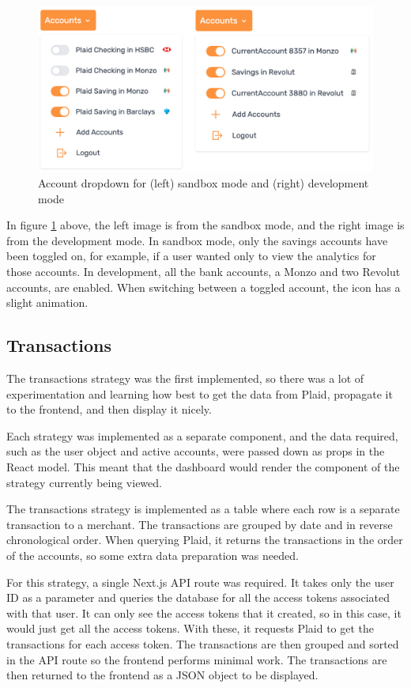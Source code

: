 \begin{figure}[H]
	\centering
	\includegraphics[width=\textwidth]{images/Accounts_dropdown.png}
	\caption{Account dropdown for (left) sandbox mode and (right) development mode}
	\label{fig:AccountsDropdown}
\end{figure}

In figure \ref{fig:AccountsDropdown} above, the left image is from the sandbox mode, and the right image is from the development mode. In sandbox mode, only the savings accounts have been toggled on, for example, if a user wanted only to view the analytics for those accounts. In development, all the bank accounts, a Monzo and two Revolut accounts, are enabled. When switching between a toggled account, the icon has a slight animation.

\subsection{Transactions}
The transactions strategy was the first implemented, so there was a lot of experimentation and learning how best to get the data from Plaid, propagate it to the frontend, and then display it nicely.

Each strategy was implemented as a separate component, and the data required, such as the user object and active accounts, were passed down as props in the React model. This meant that the dashboard would render the component of the strategy currently being viewed. 

The transactions strategy is implemented as a table where each row is a separate transaction to a merchant. The transactions are grouped by date and in reverse chronological order. When querying Plaid, it returns the transactions in the order of the accounts, so some extra data preparation was needed.

For this strategy, a single Next.js API route was required. It takes only the user ID as a parameter and queries the database for all the access tokens associated with that user. It can only see the access tokens that it created, so in this case, it would just get all the access tokens. With these, it requests Plaid to get the transactions for each access token. The transactions are then grouped and sorted in the API route so the frontend performs minimal work. The transactions are then returned to the frontend as a JSON object to be displayed.

